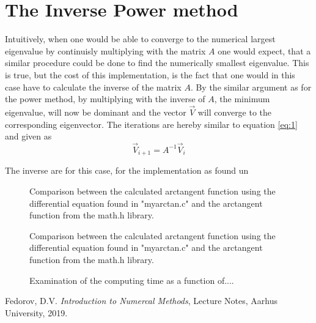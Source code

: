 \documentclass[twocolumn]{article}
\begin{document}
\section{\label{sec:2}The Inverse Power method}
Intuitively, when one would be able to converge to the numerical largest eigenvalue by continuisly multiplying with the matrix $A$ one would expect, that a similar procedure could be done to find the numerically smallest eigenvalue. This is true, but the cost of this implementation, is the fact that one would in this case have to calculate the inverse of the matrix $A$. By the similar argument as for the power method, by multiplying with the inverse of $A$, the minimum eigenvalue, will now be dominant and the vector $\vec{V}$ will converge to the corresponding eigenvector. The iterations are hereby similar to equation \eqref{eq:1} and given as
\begin{equation}
\vec{V}_{i+1} = A^{-1} \vec{V}_i \label{eq:4}
\end{equation}

The inverse are for this case, for the implementation as found un 





  \begin{figure}[h]

\caption{Comparison between the calculated arctangent function using the differential equation found in "myarctan.c" and the arctangent function from the math.h library.}
\label{fig-atan}
\end{figure}

  \begin{figure}[h]

\caption{Comparison between the calculated arctangent function using the differential equation found in "myarctan.c" and the arctangent function from the math.h library.}
\label{fig-atan}
\end{figure}


\begin{figure}[h]

\caption{Examination of the computing time as a function of....}
\label{fig-atan}
\end{figure}

\begin{thebibliography}{9}

  Fedorov, D.V.
  \textit{Introduction to Numercal Methods},
  Lecture Notes, Aarhus University,
  2019.

\end{thebibliography}
\end{document}
